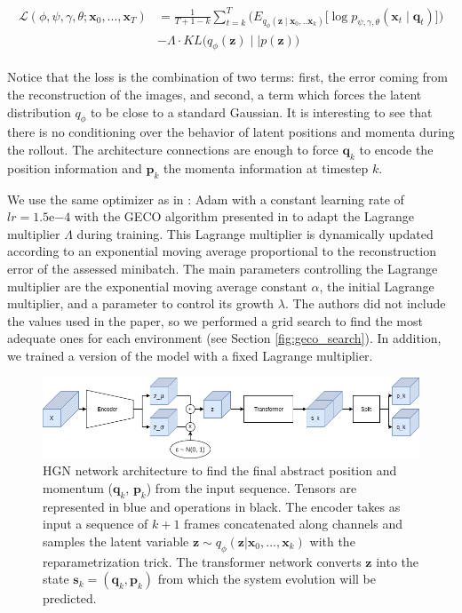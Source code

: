 \begin{align}
\begin{split}
	\mathcal{L} (\phi, \psi, \gamma, \theta; \bm{x}_0, ..., \bm{x}_T) &= \frac{1}{T + 1 - k}
    \sum_{t=k}^T
    \Big(
    E_{q_\phi (\bm{z} \mid \bm{x}_0, .. \bm{x}_k)}
    \big[
    \log p_{\psi, \gamma, \theta} (\bm{x}_t \mid \bm{q}_t)
    \big]
    \Big)
	\\ &- \Lambda \cdot KL \big(q_\phi(\bm{z}) \mid \mid p(\bm{z})\big)
\end{split}
\label{eq:loss}
\end{align}

Notice that the loss is the combination of two terms:
first, the error coming from the reconstruction of the images, and second, a term which forces the latent distribution $q_{\phi}$ to be close to a standard Gaussian.
It is interesting to see that there is no conditioning over the behavior of latent positions and momenta during the rollout.
The architecture connections are enough to force $\bm{q}_k$ to encode the position information and $\bm{p}_k$ the momenta information at timestep $k$. 

We use the same optimizer as in \cite{hgn}:
Adam \cite{adam} with a constant learning rate of $lr=1.5\mathrm{e}{-4}$ with the GECO algorithm presented in \cite{geco} to adapt the Lagrange multiplier $\Lambda$ during training.
This Lagrange multiplier is dynamically updated according to an exponential moving average proportional to the reconstruction error of the assessed minibatch.
The main parameters controlling the Lagrange multiplier are the exponential moving average constant $\alpha$, the initial Lagrange multiplier, and a parameter to control its growth $\lambda$.
The authors did not include the values used in the paper, so we performed a grid search to find the most adequate ones for each environment (see Section \ref{fig:geco_search}).
In addition, we trained a version of the model with a fixed Lagrange multiplier.

\begin{figure}[h]
\centering
\includegraphics[width=\textwidth]{../openreview/pictures/HGN_Architecture.png}
\caption{HGN network architecture to find the final abstract position and momentum ($\bm{q}_k$, $\bm{p}_k$) from the input sequence. Tensors are represented in blue and operations in black. The encoder takes as input a sequence of $k+1$ frames concatenated along channels and samples the latent variable $\bm{z} \sim q_{\phi}(\bm{z} \vert \bm{x}_0, ..., \bm{x}_k)$ with the reparametrization trick. The transformer network converts $\bm{z}$ into the state $\bm{s}_k = (\bm{q}_k, \bm{p}_k)$ from which the system evolution will be predicted.}
\label{fig:initial_cond}
\end{figure}

